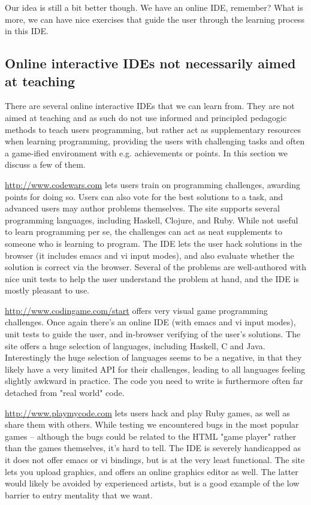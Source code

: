 Our idea is still a bit better though. We have an online IDE, remember? What 
is more, we can have nice exercises that guide the user through the learning 
process in this IDE.

\subsection{Online interactive IDEs not necessarily aimed at teaching}
There are several online interactive IDEs that we can learn from. They are not 
aimed at teaching and as such do not use informed and principled pedagogic 
methods to teach users programming, but rather act as supplementary resources 
when learning programming, providing the users with challenging tasks and 
often a game-ified environment with e.g. achievements or points. In this 
section we discuss a few of them.

\url{http://www.codewars.com} lets users train on programming challenges, 
awarding points for doing so. Users can also vote for the best solutions to a
task, and advanced users may author problems themselves. The site supports 
several programming languages, including Haskell, Clojure, and Ruby. While not
useful to learn programming per se, the challenges can act as neat supplements 
to someone who is learning to program. The IDE lets the user hack solutions 
in the browser (it includes emacs and vi input modes), and also evaluate 
whether the solution is correct via the browser. Several of the problems are 
well-authored with nice unit tests to help the user understand the problem at 
hand, and the IDE is mostly pleasant to use.

\url{http://www.codingame.com/start} offers very visual game programming 
challenges. Once again there's an online IDE (with emacs and vi input modes), 
unit tests to guide the user, and in-browser verifying of the user's 
solutions. The site offers a huge selection of languages, including Haskell, C 
and Java. Interestingly the huge selection of languages seems to be a negative,
in that they likely have a very limited API for their challenges, leading to
all languages feeling slightly awkward in practice. The code you need to write
is furthermore often far detached from "real world" code.

\url{http://www.playmycode.com} lets users hack and play Ruby games, as well as
share them with others. While testing we encountered bugs in the most popular
games -- although the bugs could be related to the HTML "game player" rather
than the games themselves, it's hard to tell. The IDE is severely handicapped
as it does not offer emacs or vi bindings, but is at the very least functional.
The site lets you upload graphics, and offers an online graphics editor as
well. The latter would likely be avoided by experienced artists, but is a
good example of the low barrier to entry mentality that we want.

